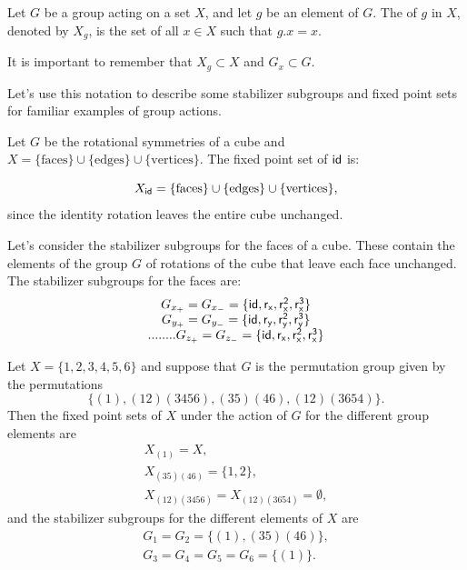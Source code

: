 \begin{defn} \label{FixedPoint}
Let $G$ be a group acting on a set $X$, and let $g$ be
an element of $G$. The  of $g$ in $X$, denoted by $X_g$, is the set of 
all $x \in X$ such that $g.x = x$.
\end{defn}
\noindent
It is important to remember that $X_g \subset X$ and $G_x \subset G$. 

Let's use this notation to describe some stabilizer subgroups and fixed point sets for familiar examples of group actions.

\begin{example}\label{example:actions:FixedPoint1}
Let $G$ be the rotational symmetries of a cube and $X=\{\text{faces}\}\cup\{\text{edges}\}\cup\{\text{vertices}\}$.
The fixed point set of $\sf{id}$ is: 

$$X_{\sf{id}}=\{\text{faces}\}\cup\{\text{edges}\}\cup\{\text{vertices}\},$$
since the identity rotation  leaves the entire cube unchanged.  
\end{example}

\begin{example}\label{example:actions:FixedPoint2}
Let's consider the stabilizer subgroups for the faces of a cube.  These contain the elements of the group $G$ of rotations of the cube that leave each face unchanged.  The stabilizer subgroups for the faces are:
$$\begin{array} {c}
G_{x_+}=G_{x_-}=\{\sf{id},r_x,r_x^2,r_x^3\}\\
G_{y_+}=G_{y_-}=\{\sf{id},r_y,r_y^2,r_y^3\}\\......
..G_{z_+}=G_{z_-}=\{\sf{id},r_x,r_x^2,r_x^3\}
\end{array}$$
\end{example}

\begin{example}\label{example:actions:FixedPoint3}
Let $X = \{1, 2, 3, 4, 5, 6\}$ and suppose that $G$ is the permutation
group given by the permutations 
$$\{(1), (1 2)(3 4 5 6), (3 5)(4 6), (1 2)( 3 6 5 4)\}.$$
Then the fixed point sets of $X$ under the action of $G$ for the different group elements are
$$
\begin{array}{c}
X_{(1)} = X, \\
X_{(3 5)(4 6)} = \{1,2\}, \\
X_{(1 2)(3 4 5 6)} = X_{(1 2)(3 6 5 4)} = \emptyset,
\end{array}
$$
and the stabilizer subgroups for the different elements of $X$ are
$$
\begin{array}{c}
G_1 = G_2 = \{(1), (3 5)(4 6) \}, \\
G_3 = G_4 = G_5 = G_6 = \{(1)\}.
\end{array}
$$
\end{example}

